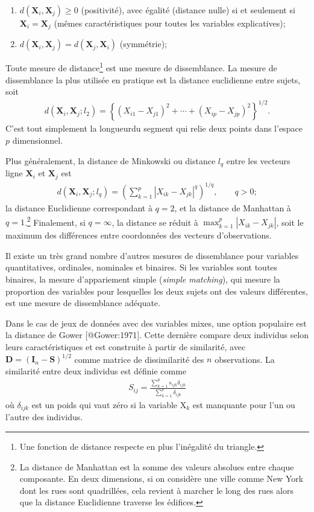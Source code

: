 \documentclass[
  11pt,
  letterpaper,
]{book}
\providecommand{\tightlist}{%
  \setlength{\itemsep}{0pt}\setlength{\parskip}{0pt}}\usepackage{longtable,booktabs,array}
\theoremstyle{definition}
\theoremstyle{remark}
\begin{document}
\begin{enumerate}
\def\labelenumi{\arabic{enumi})}
\tightlist
\item
  \(d(\mathbf{X}_i, \mathbf{X}_j) \geq 0\) (positivité), avec égalité
  (distance nulle) si et seulement si \(\mathbf{X}_i=\mathbf{X}_j\)
  (mêmes caractéristiques pour toutes les variables explicatives);
\item
  \(d(\mathbf{X}_i, \mathbf{X}_j)=d(\mathbf{X}_j, \mathbf{X}_i)\)
  (symmétrie);
\end{enumerate}

Toute mesure de distance\footnote{Une fonction de distance respecte en
  plus l'inégalité du triangle.} est une mesure de dissemblance. La
mesure de dissemblance la plus utilisée en pratique est la distance
euclidienne entre sujets, soit \begin{align*}
d(\mathbf{X}_i, \mathbf{X}_j; l_2) = \left\{(X_{i1}-X_{j1})^2 + \cdots + (X_{ip}-X_{jp})^2\right\}^{1/2}.
\end{align*} C'est tout simplement la longueurdu segment qui relie deux
points dans l'espace \(p\) dimensionnel.

Plus généralement, la distance de Minkowski ou distance \(l_q\) entre
les vecteurs ligne \(\mathbf{X}_i\) et \(\mathbf{X}_j\) est
\begin{align*}
d(\mathbf{X}_i, \mathbf{X}_j; l_q) = \left( \sum_{k=1}^p |X_{ik}-X_{jk}|^q \right)^{1/q},\qquad q > 0;
\end{align*} la distance Euclidienne correspondant à \(q=2\), et la
distance de Manhattan à \(q=1\).\footnote{La distance de Manhattan est
  la somme des valeurs absolues entre chaque composante. En deux
  dimensions, si on considère une ville comme New York dont les rues
  sont quadrillées, cela revient à marcher le long des rues alors que la
  distance Euclidienne traverse les édifices.} Finalement, si
\(q=\infty\), la distance se réduit à \(\max_{k=1}^p |X_{ik}-X_{jk}|\),
soit le maximum des différences entre coordonnées des vecteurs
d'observations.

Il existe un très grand nombre d'autres mesures de dissemblance pour
variables quantitatives, ordinales, nominales et binaires. Si les
variables sont toutes binaires, la mesure d'appariement simple
(\emph{simple matching}), qui mesure la proportion des variables pour
lesquelles les deux sujets ont des valeurs différentes, est une mesure
de dissemblance adéquate.

Dans le cas de jeux de données avec des variables mixes, une option
populaire est la distance de Gower {[}@Gower:1971{]}. Cette dernière
compare deux individus selon leurs caractéristiques et est construite à
partir de similarité, avec
\(\mathbf{D} = (\mathbf{I}_n-\mathbf{S})^{1/2}\) comme matrice de
dissimilarité des \(n\) observations. La similarité entre deux individus
est définie comme \begin{align*}
S_{ij} = \frac{\sum_{k=1}^p s_{ijk} \delta_{ijk}}{\sum_{k=1}^p \delta_{ijk}}
\end{align*} où \(\delta_{ijk}\) est un poids qui vaut zéro si la
variable \(\mathrm{X}_k\) est manquante pour l'un ou l'autre des
individus.
\end{document}

